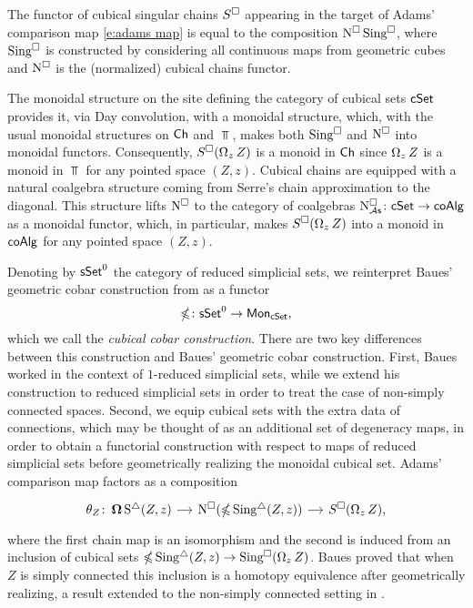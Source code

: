 The functor of cubical singular chains $S^\square$ appearing in the target of Adams' comparison map \eqref{e:adams map} is equal to the composition $\operatorname{N^{\square}} \operatorname{Sing^{\square}}$, where $\operatorname{Sing^{\square}}$ is constructed by considering all continuous maps from geometric cubes and $\operatorname{N^{\square}}$ is the (normalized) cubical chains functor.

The monoidal structure on the site defining the category of cubical sets $\mathsf{cSet}$ provides it, via Day convolution, with a monoidal structure, which, with the usual monoidal structures on $\mathsf{Ch}$ and $\Top$, makes both $\operatorname{Sing^{\square}}$ and $\operatorname{N^{\square}}$ into monoidal functors.
Consequently, $S^\square(\operatorname{\Omega}_z Z)$ is a monoid in $\mathsf{Ch}$ since $\operatorname{\Omega}_z Z$ is a monoid in $\Top$ for any pointed space $(Z, z)$.
Cubical chains are equipped with a natural coalgebra structure coming from Serre's chain approximation to the diagonal.
This structure lifts $\operatorname{N^{\square}}$ to the category of coalgebras $\operatorname{N^{\square}_{{\mathcal{A}\mathsf{s}}}} \colon \mathsf{cSet} \to \mathsf{coAlg}$ as a monoidal functor, which, in particular, makes $S^\square(\operatorname{\Omega}_z Z)$ into a monoid in $\mathsf{coAlg}$ for any pointed space $(Z, z)$.

Denoting by $\mathsf{sSet}^0$ the category of reduced simplicial sets, we reinterpret Baues' geometric cobar construction from \cite{baues1998hopf} as a functor
\[
\operatorname{\mathbb{\Omega}} \colon \mathsf{sSet}^0 \to \mathsf{Mon}_{\mathsf{cSet}},
\]
which we call the \textit{cubical cobar construction}.
There are two key differences between this construction and Baues' geometric cobar construction.
First, Baues worked in the context of $1$-reduced simplicial sets, while we extend his construction to reduced simplicial sets in order to treat the case of non-simply connected spaces.
Second, we equip cubical sets with the extra data of connections, which may be thought of as an additional set of degeneracy maps, in order to obtain a functorial construction with respect to maps of reduced simplicial sets before geometrically realizing the monoidal cubical set.
Adams' comparison map factors as a composition
\begin{equation} \label{e:baues factorization of adams map}
\begin{tikzcd}[column sep = small]
\theta_Z \colon \cobar \sS(Z, z) \arrow[r] &
\cchains(\ccobar \sSing(Z, z)) \arrow[r] &
S^{\cube}(\loops_z Z),
\end{tikzcd}
\end{equation}
where the first chain map is an isomorphism and the second is induced from an inclusion of cubical sets $\operatorname{\mathbb{\Omega}} \operatorname{Sing^{\triangle}}(Z, z) \to \operatorname{Sing^{\square}}(\operatorname{\Omega}_z Z)$.
Baues proved that when $Z$ is simply connected this inclusion is a homotopy equivalence after geometrically realizing, a result extended to the non-simply connected setting in \cite{rivera2019path}.

